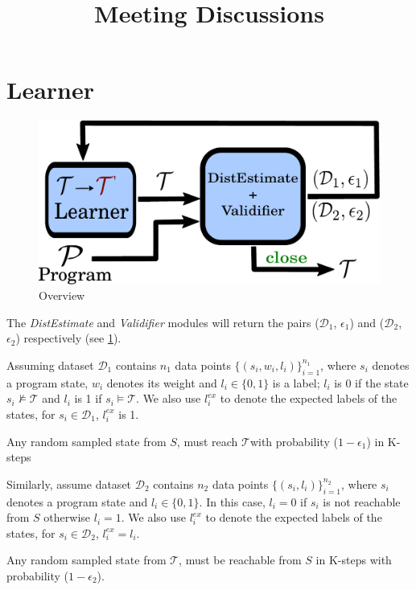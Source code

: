 \documentclass{llncs}
\newcommand{\candidate}{$\mathcal{T}$}
\newcommand{\distdata}{$\mathcal{D}_1$}
\newcommand{\validata}{$\mathcal{D}_2$}
\newcommand{\sepa}{\vspace{0.08in} }
\begin{document}
	\title{Meeting Discussions}
	\author{}
	\institute{}
	\maketitle              %
	
\section{Learner}

	\begin{figure}
		\includegraphics[scale=0.5]{assets/archi.pdf}
		\caption{Overview}
		\label{fig:overview}
	\end{figure}


The \textit{DistEstimate} and \textit{Validifier} modules will return the pairs (\distdata, $\epsilon_1$) and (\validata, $\epsilon_2$) respectively (see \cref{fig:overview}). 

Assuming dataset $\text{\distdata }$ contains $n_1$ data points $\{(s_i, w_i, l_i)\}_{i=1}^{n_1}$,  where $s_i$ denotes a program state, $w_i$ denotes its weight and $l_i \in \{0,1\}$ is a label; $l_i$ is 0 if the state $s_i \not \models \text{\candidate}$ and $l_i$ is 1 if $s_i \models \text{\candidate}$. We also use $l_i^{ex}$ to denote the expected labels of the states, for $s_i \in \text{\distdata}$, $l_i^{ex}$ is 1.
\sepa
\begin{tcolorbox}[colback=lightgray!10!white, colframe=black!30!black,title=Error Probability $\epsilon_1$ , sharp corners, width=\textwidth, boxsep=1pt]
	\centering
	Any random sampled state from $S$, must reach \candidate with probability ($1 - \epsilon_1$) in K-steps
\end{tcolorbox}
\sepa
Similarly, assume dataset $\text{\validata }$ contains $n_2$ data points $\{(s_i, l_i)\}_{i=1}^{n_2}$, where $s_i$ denotes a program state and $l_i \in \{0,1\}$. In this case, $l_i = 0$ if $s_i$ is not reachable from $S$ otherwise $l_i = 1$. We also use $l_i^{ex}$ to denote the expected labels of the states, for $s_i \in \text{\validata}$, $l_i^{ex} = l_i$.
\sepa
\begin{tcolorbox}[colback=lightgray!10!white, colframe=black!30!black,title=Error Probability $\epsilon_2$ , sharp corners, width=\textwidth, boxsep=1pt]
	\centering
	Any random sampled state from \candidate, must be reachable from $S$ in K-steps with probability ($1 - \epsilon_2$).
\end{tcolorbox}
\end{document}
